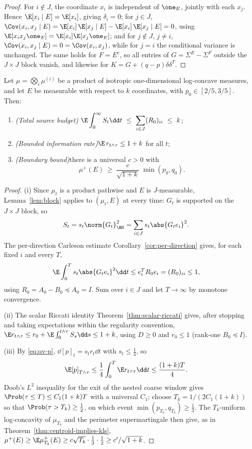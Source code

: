 \documentclass[../../main.tex]{subfiles}
\begin{document}
\begin{proof}
For $i\notin J$, the coordinate $x_i$ is independent of $\one_E$, jointly with each $x_j$.
Hence $\E[x_i\mid E]=\E[x_i]$, giving $\delta_i=0$; for $j\in J$,
$\Cov(x_i,x_j\mid E)=\E[x_i]\,\E[x_j\mid E]-\E[x_i]\,\E[x_j\mid E]=0$, using
$\E[x_ix_j\one_E]=\E[x_i]\E[x_j\one_E]$; and for $j\notin J$, $j\ne i$,
$\Cov(x_i,x_j\mid E)=0=\Cov(x_i,x_j)$, while for $j=i$ the conditional variance is unchanged.
The same holds for $F=E^c$, so all entries of $G=\Sigma^E-\Sigma^F$ outside the $J\times J$
block vanish, and likewise for $K=G+(q-p)\delta\delta^T$.
\end{proof}

\begin{theorem}
\label{thm:budget}
Let $\mu=\bigotimes_i\mu^{(i)}$ be a product of isotropic one-dimensional log-concave
measures, and let $E$ be measurable with respect to $k$ coordinates, with
$p_0\in[2/5,3/5]$. Then:
\begin{enumerate}[label=(\roman*),leftmargin=2.2em]
\item \emph{(Total source budget)}\quad
$\displaystyle \E\int_0^\infty S_t\dd t\ \le\ \sum_{i\in J}(R_0)_{ii}\ \le\ k$;
\item \emph{(Bounded information rate)}\quad $\E\,r_{t\wedge\tau}\le1+k$ for all $t$;
\item \emph{(Boundary bound)}\quad there is a universal $c>0$ with
\[
  \mu^+(E)\ \ge\ \frac{c}{\sqrt{1+k}}\;\min(p_0,q_0).
\]
\end{enumerate}
\end{theorem}

\begin{proof}
(i) Since $\mu_t$ is a product pathwise and $E$ is $J$-measurable, Lemma~\ref{lem:block}
applies to $(\mu_t,E)$ at every time: $G_t$ is supported on the $J\times J$ block, so
\[
  S_t=s_t\norm{G_t}_\HS^2=\sum_{i\in J}s_t\abs{G_te_i}^2 .
\]
The per-direction Carleson estimate Corollary~\ref{cor:per-direction} gives, for each fixed $i$
and every $T$,
\[
  \E\int_0^T s_t\abs{G_te_i}^2\dd t\le e_i^TR_0e_i=(R_0)_{ii}\le1,
\]
using $R_0=A_0-B_0\preceq A_0=I$. Sum over $i\in J$ and let $T\to\infty$ by monotone convergence.

(ii) The scalar Riccati identity Theorem~\ref{thm:scalar-riccati} gives, after stopping and taking
expectations within the regularity convention,
$\E r_{t\wedge\tau}\le r_0+\E\int_0^{t\wedge\tau}S_s\dd s\le1+k$, using $D\ge0$ and
$r_0\le1$ (rank-one $B_0\preceq I$).

(iii) By \eqref{eq:qv-p}, $\dd[p]_t=s_tr_t\dd t$ with $s_t\le\tfrac14$, so
\[
  \E[p]_{T\wedge\tau}\le\frac14\int_0^T\E r_{t\wedge\tau}\dd t\le\frac{(1+k)T}4 .
\]
Doob's $L^2$ inequality for the exit of the nested coarse window gives
$\Prob(\tau\le T)\le C_1(1+k)T$ with a universal $C_1$; choose $T_k=1/(2C_1(1+k))$ so that
$\Prob(\tau>T_k)\ge\tfrac12$, on which event $\min(p_{T_k},q_{T_k})\ge\tfrac13$. The
$T_k$-uniform log-concavity of $\mu_{T_k}$ and the perimeter supermartingale then give, as in
Theorem~\ref{thm:centroid-implies-kls},
$\mu^+(E)\ge\E\mu_{T_k}^+(E)\ge c\sqrt{T_k}\cdot\tfrac13\cdot\tfrac12\ge c'/\sqrt{1+k}$.
\end{proof}
\end{document}
